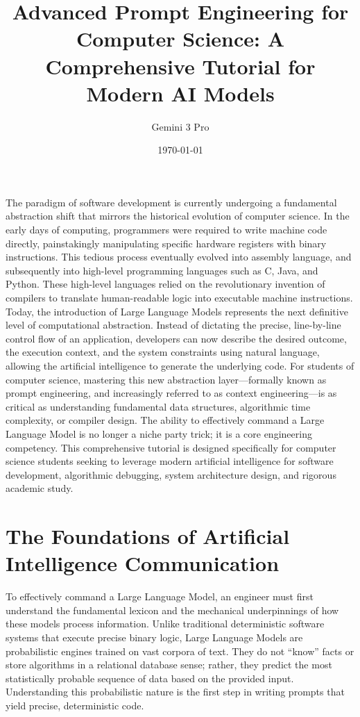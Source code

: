 \documentclass[12pt]{article}
\title{Advanced Prompt Engineering for Computer Science: A Comprehensive Tutorial for Modern AI Models}
\author{Gemini 3 Pro}
\date{\today}
\begin{document}
\maketitle
The paradigm of software development is currently undergoing a fundamental abstraction shift that
mirrors the historical evolution of computer science. In the early days of computing, programmers were required
to write machine code directly, painstakingly manipulating specific hardware registers with binary
instructions. This tedious process eventually evolved into assembly language, and subsequently into high-level
programming languages such as C, Java, and Python. These high-level languages relied on the revolutionary
invention of compilers to translate human-readable logic into executable machine instructions. Today, the
introduction of Large Language Models represents the next definitive level of computational
abstraction. Instead of dictating the precise, line-by-line control flow of an application, developers can now
describe the desired outcome, the execution context, and the system constraints using natural language,
allowing the artificial intelligence to generate the underlying code. For students of computer science,
mastering this new abstraction layer---formally known as prompt engineering, and increasingly referred to as
context engineering---is as critical as understanding fundamental data structures, algorithmic time complexity,
or compiler design. The ability to effectively command a Large Language Model is no longer a niche party trick;
it is a core engineering competency. This comprehensive tutorial is designed specifically for computer science
students seeking to leverage modern artificial intelligence for software development, algorithmic debugging,
system architecture design, and rigorous academic study.

\section{The Foundations of Artificial Intelligence Communication}
To effectively command a Large Language
Model, an engineer must first understand the fundamental lexicon and the mechanical underpinnings of how these
models process information. Unlike traditional deterministic software systems that execute precise binary
logic, Large Language Models are probabilistic engines trained on vast corpora of text. They do not ``know''
facts or store algorithms in a relational database sense; rather, they predict the most statistically probable
sequence of data based on the provided input. Understanding this probabilistic nature is the first step in
writing prompts that yield precise, deterministic code. 
\end{document}
